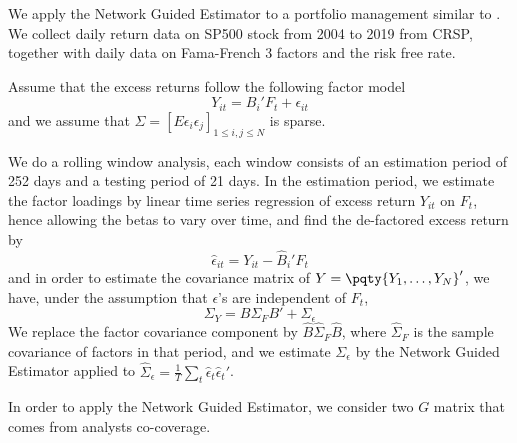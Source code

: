 We apply the Network Guided Estimator to a portfolio management similar to \cite{ledoit2004HoneyShrunk}. We collect daily return data on SP500 stock from 2004 to 2019 from CRSP, together with daily data on Fama-French 3 factors and the risk free rate. 

Assume that the excess returns follow the following factor model
\begin{equation*}
    Y_{it} = B_{i}'F_{t} + \epsilon_{it}
\end{equation*}
and we assume that \(\Sigma = [E \epsilon_{i} \epsilon_{j}]_{1 \leq i,j\leq N}\) is sparse. 

We do a rolling window analysis, each window consists of an estimation period of 252 days and a testing period of 21 days. In the estimation period, we estimate the factor loadings by linear time series regression of excess return \(Y_{it}\) on \(F_{t}\), hence allowing the betas to vary over time, and find the de-factored excess return by 
\begin{equation*}
    \hat{\epsilon}_{it} = Y_{it} - \hat{B}_{i}'F_{t}
\end{equation*}
and in order to estimate the covariance matrix of \(Y = \pqty{Y_{1}, \dots, Y_{N}}'\), we have, under the assumption that \(\epsilon\)'s are independent of \(F_{t}\), 
\begin{equation*}
    \Sigma_{Y} = B \Sigma_{F} B' + \Sigma_{\epsilon}
\end{equation*}
We replace the factor covariance component by \(\hat{B} \hat{\Sigma}_{F} \hat{B}\), where \(\hat{\Sigma}_{F}\) is the sample covariance of factors in that period, and we estimate \(\Sigma_{\epsilon}\) by the Network Guided Estimator applied to \(\hat{\Sigma}_{\epsilon} = \frac{1}{T} \sum_{t}\hat{\epsilon}_{t} \hat{\epsilon}_{t}'\). 

In order to apply the Network Guided Estimator, we consider two \(G\) matrix that comes from analysts co-coverage. 